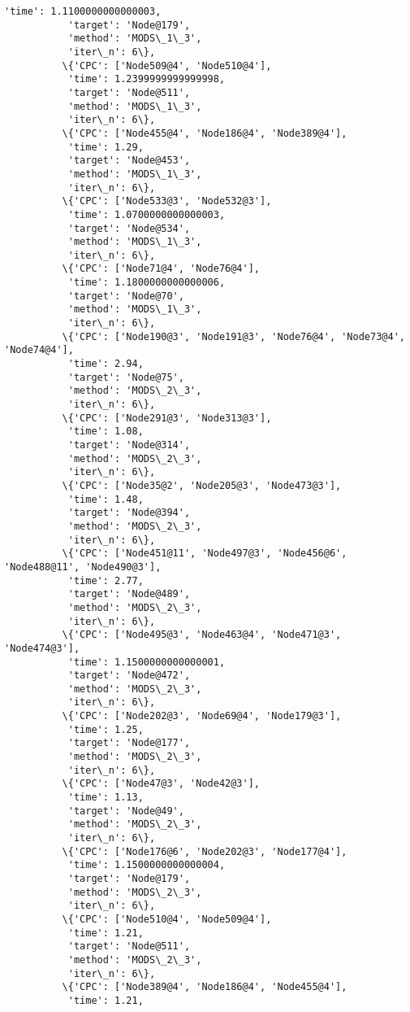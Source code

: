 \documentclass[11pt]{article}
\begin{document}
\begin{Verbatim}[commandchars=\\\{\}]
           'time': 1.1100000000000003,
           'target': 'Node@179',
           'method': 'MODS\_1\_3',
           'iter\_n': 6\},
          \{'CPC': ['Node509@4', 'Node510@4'],
           'time': 1.2399999999999998,
           'target': 'Node@511',
           'method': 'MODS\_1\_3',
           'iter\_n': 6\},
          \{'CPC': ['Node455@4', 'Node186@4', 'Node389@4'],
           'time': 1.29,
           'target': 'Node@453',
           'method': 'MODS\_1\_3',
           'iter\_n': 6\},
          \{'CPC': ['Node533@3', 'Node532@3'],
           'time': 1.0700000000000003,
           'target': 'Node@534',
           'method': 'MODS\_1\_3',
           'iter\_n': 6\},
          \{'CPC': ['Node71@4', 'Node76@4'],
           'time': 1.1800000000000006,
           'target': 'Node@70',
           'method': 'MODS\_1\_3',
           'iter\_n': 6\},
          \{'CPC': ['Node190@3', 'Node191@3', 'Node76@4', 'Node73@4', 'Node74@4'],
           'time': 2.94,
           'target': 'Node@75',
           'method': 'MODS\_2\_3',
           'iter\_n': 6\},
          \{'CPC': ['Node291@3', 'Node313@3'],
           'time': 1.08,
           'target': 'Node@314',
           'method': 'MODS\_2\_3',
           'iter\_n': 6\},
          \{'CPC': ['Node35@2', 'Node205@3', 'Node473@3'],
           'time': 1.48,
           'target': 'Node@394',
           'method': 'MODS\_2\_3',
           'iter\_n': 6\},
          \{'CPC': ['Node451@11', 'Node497@3', 'Node456@6', 'Node488@11', 'Node490@3'],
           'time': 2.77,
           'target': 'Node@489',
           'method': 'MODS\_2\_3',
           'iter\_n': 6\},
          \{'CPC': ['Node495@3', 'Node463@4', 'Node471@3', 'Node474@3'],
           'time': 1.1500000000000001,
           'target': 'Node@472',
           'method': 'MODS\_2\_3',
           'iter\_n': 6\},
          \{'CPC': ['Node202@3', 'Node69@4', 'Node179@3'],
           'time': 1.25,
           'target': 'Node@177',
           'method': 'MODS\_2\_3',
           'iter\_n': 6\},
          \{'CPC': ['Node47@3', 'Node42@3'],
           'time': 1.13,
           'target': 'Node@49',
           'method': 'MODS\_2\_3',
           'iter\_n': 6\},
          \{'CPC': ['Node176@6', 'Node202@3', 'Node177@4'],
           'time': 1.1500000000000004,
           'target': 'Node@179',
           'method': 'MODS\_2\_3',
           'iter\_n': 6\},
          \{'CPC': ['Node510@4', 'Node509@4'],
           'time': 1.21,
           'target': 'Node@511',
           'method': 'MODS\_2\_3',
           'iter\_n': 6\},
          \{'CPC': ['Node389@4', 'Node186@4', 'Node455@4'],
           'time': 1.21,

\end{Verbatim}
\end{document}
